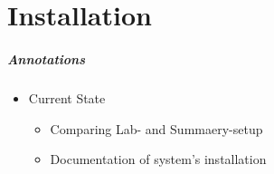 \chapter{Installation}
\label{installation}

\paragraph{Annotations}

\begin{itemize}
	\item Current State
	\begin{itemize}
		\item Comparing Lab- and Summaery-setup
		\item Documentation of system's installation
	\end{itemize}
\end{itemize}
